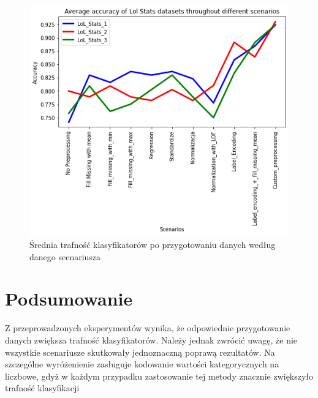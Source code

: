 \documentclass{book}
\begin{document}
\begin{figure}[H]
\centerline{\includegraphics{Lol_Stats_Avg}}
\centering
\caption{Średnia trafność klasyfikatorów po przygotowaniu 
danych według danego scenariusza}
\end{figure}

\section{Podsumowanie}
Z przeprowadzonych eksperymentów wynika, 
że odpowiednie przygotowanie danych zwiększa trafność 
klasyfikatorów. Należy jednak zwrócić uwagę, że nie wszystkie 
scenariusze skutkowały jednoznaczną poprawą rezultatów. 
Na szczególne wyróżenienie zasługuje kodowanie wartości 
kategorycznych na liczbowe, gdyż w każdym przypadku zastosowanie 
tej metody znacznie zwiększyło trafność klasyfikacji
\end{document}
